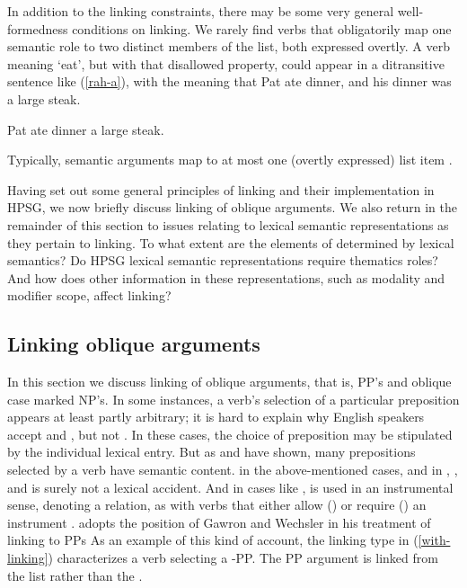 \documentclass[output=paper
                ,modfonts
                ,nonflat
	        ,collection
	        ,collectionchapter
	        ,collectiontoclongg
 	        ,biblatex
                ,babelshorthands
                ,newtxmath
                ,draftmode
                ,colorlinks, citecolor=brown
]{./langsci/langscibook}
\begin{document}
In addition to the linking constraints, there may be some very general well-formedness conditions on linking.  We rarely find verbs that obligatorily map one semantic role to two distinct members of the \argst list, both expressed overtly.  A verb meaning `eat', but with that disallowed property, could appear in a ditransitive sentence like (\ref{rah-a}), with the meaning that Pat ate dinner, and his dinner was a large steak.  

\begin{exe}
\label{rah-a} 
	\ex *Pat ate dinner a large steak.
\end{exe}

\noindent
Typically, semantic arguments map to at most one (overtly expressed) \argst list item \citep[262-268]{Davis2001}.

Having set out some general principles of linking and their implementation in HPSG, we now briefly discuss linking of oblique arguments.
We also return in the remainder of this section to issues relating to lexical semantic representations as they pertain to linking.
To what extent are the elements of \argst determined by lexical semantics?
Do HPSG lexical semantic representations require thematics roles?
And how does other information in these representations, such as modality and modifier scope, affect linking?

\subsection{Linking oblique arguments}
In this section we discuss linking of oblique arguments, that is, PP's and oblique case marked NP's.
In some instances, a verb's selection of a particular preposition appears at least partly arbitrary;
it is hard to explain why English speakers accept  and , but  not .
In these cases, the choice of preposition may be stipulated by the individual lexical entry.
But as \citet{Gawron1986} and \citet{Wechsler1995} have shown, many prepositions selected by a verb have semantic content.
 in the above-mentioned cases, and in , , and  is surely not a lexical accident.
And in  cases like ,  is used in an instrumental sense, denoting a  relation, as with verbs that either allow () or require () an instrument \citep{KoenigandDavis2006}.
\citet{Davis1996,Davis2001} adopts the position of Gawron and Wechsler in his treatment of linking to PPs
As an example of this kind of account, the linking type in (\ref{with-linking}) characterizes a verb selecting a -PP. 
The PP argument is linked from the \rels list  rather than the . 
\end{document}
